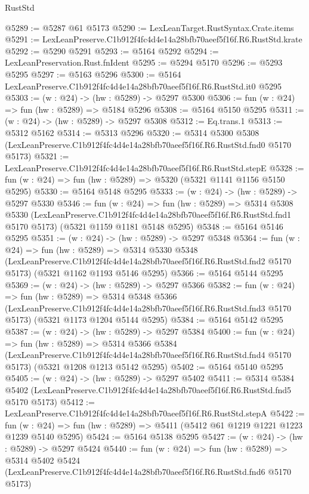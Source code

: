 \begin{lexlean}{RustStd}
\begin{coremodule}
@5289 := @5287 @61 @5173
@5290 := LexLeanTarget.RustSyntax.Crate.items
@5291 := LexLeanPreserve.C1b912f4fc4d4e14a28bfb70aeef5f16f.R6.RustStd.krate
@5292 := @5290 @5291
@5293 := @5164 @5292
@5294 := LexLeanPreservation.Rust.fnIdent
@5295 := @5294 @5170
@5296 := @5293 @5295
@5297 := @5163 @5296
@5300 := @5164 LexLeanPreserve.C1b912f4fc4d4e14a28bfb70aeef5f16f.R6.RustStd.it0 @5295
@5303 := (w : @24) -> (hw : @5289) -> @5297 @5300
@5306 := fun (w : @24) => fun (hw : @5289) => @5184 @5296
@5308 := @5164 @5150 @5295
@5311 := (w : @24) -> (hw : @5289) -> @5297 @5308
@5312 := Eq.trans.{1}
@5313 := @5312 @5162
@5314 := @5313 @5296
@5320 := @5314
    @5300
    @5308
    (LexLeanPreserve.C1b912f4fc4d4e14a28bfb70aeef5f16f.R6.RustStd.fnd0 @5170 @5173)
@5321 := LexLeanPreserve.C1b912f4fc4d4e14a28bfb70aeef5f16f.R6.RustStd.stepE
@5328 := fun (w : @24) => fun (hw : @5289) => @5320 (@5321 @1141 @1156 @5150 @5295)
@5330 := @5164 @5148 @5295
@5333 := (w : @24) -> (hw : @5289) -> @5297 @5330
@5346 := fun (w : @24) =>
  fun (hw : @5289) =>
  @5314
    @5308
    @5330
    (LexLeanPreserve.C1b912f4fc4d4e14a28bfb70aeef5f16f.R6.RustStd.fnd1 @5170 @5173)
    (@5321 @1159 @1181 @5148 @5295)
@5348 := @5164 @5146 @5295
@5351 := (w : @24) -> (hw : @5289) -> @5297 @5348
@5364 := fun (w : @24) =>
  fun (hw : @5289) =>
  @5314
    @5330
    @5348
    (LexLeanPreserve.C1b912f4fc4d4e14a28bfb70aeef5f16f.R6.RustStd.fnd2 @5170 @5173)
    (@5321 @1162 @1193 @5146 @5295)
@5366 := @5164 @5144 @5295
@5369 := (w : @24) -> (hw : @5289) -> @5297 @5366
@5382 := fun (w : @24) =>
  fun (hw : @5289) =>
  @5314
    @5348
    @5366
    (LexLeanPreserve.C1b912f4fc4d4e14a28bfb70aeef5f16f.R6.RustStd.fnd3 @5170 @5173)
    (@5321 @1173 @1204 @5144 @5295)
@5384 := @5164 @5142 @5295
@5387 := (w : @24) -> (hw : @5289) -> @5297 @5384
@5400 := fun (w : @24) =>
  fun (hw : @5289) =>
  @5314
    @5366
    @5384
    (LexLeanPreserve.C1b912f4fc4d4e14a28bfb70aeef5f16f.R6.RustStd.fnd4 @5170 @5173)
    (@5321 @1208 @1213 @5142 @5295)
@5402 := @5164 @5140 @5295
@5405 := (w : @24) -> (hw : @5289) -> @5297 @5402
@5411 := @5314
    @5384
    @5402
    (LexLeanPreserve.C1b912f4fc4d4e14a28bfb70aeef5f16f.R6.RustStd.fnd5 @5170 @5173)
@5412 := LexLeanPreserve.C1b912f4fc4d4e14a28bfb70aeef5f16f.R6.RustStd.stepA
@5422 := fun (w : @24) => fun (hw : @5289) => @5411 (@5412 @61 @1219 @1221 @1223 @1239 @5140 @5295)
@5424 := @5164 @5138 @5295
@5427 := (w : @24) -> (hw : @5289) -> @5297 @5424
@5440 := fun (w : @24) =>
  fun (hw : @5289) =>
  @5314
    @5402
    @5424
    (LexLeanPreserve.C1b912f4fc4d4e14a28bfb70aeef5f16f.R6.RustStd.fnd6 @5170 @5173)

\end{coremodule}
\end{lexlean}
